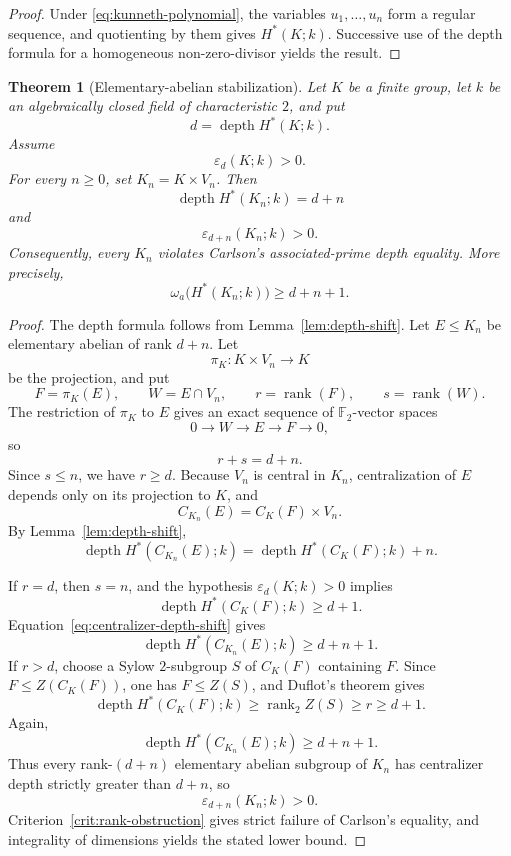 \documentclass[11pt]{amsart}
\newtheorem{theorem}{Theorem}[section]
\theoremstyle{definition}
\theoremstyle{remark}
\DeclareMathOperator{\depth}{depth}
\DeclareMathOperator{\rank}{rank}
\newcommand{\F}{\mathbb F}
\begin{document}
\begin{proof}
Under \eqref{eq:kunneth-polynomial}, the variables $u_1,\dots,u_n$ form a regular sequence, and quotienting by them gives $H^*(K;k)$.  Successive use of the depth formula for a homogeneous non-zero-divisor yields the result.
\end{proof}

\begin{theorem}[Elementary-abelian stabilization]
\label{thm:stabilization}
Let $K$ be a finite group, let $k$ be an algebraically closed field of characteristic $2$, and put
\[
d=\depth H^*(K;k).
\]
Assume
\[
\varepsilon_d(K;k)>0.
\]
For every $n\geq0$, set $K_n=K\times V_n$.  Then
\[
\depth H^*(K_n;k)=d+n
\]
and
\[
\varepsilon_{d+n}(K_n;k)>0.
\]
Consequently, every $K_n$ violates Carlson's associated-prime depth equality.  More precisely,
\[
\omega_a\bigl(H^*(K_n;k)\bigr)\geq d+n+1.
\]
\end{theorem}

\begin{proof}
The depth formula follows from Lemma~\ref{lem:depth-shift}.  Let $E\leq K_n$ be elementary abelian of rank $d+n$.  Let
\[
\pi_K:K\times V_n\longrightarrow K
\]
be the projection, and put
\[
F=\pi_K(E),
\qquad
W=E\cap V_n,
\qquad
r=\rank(F),
\qquad
s=\rank(W).
\]
The restriction of $\pi_K$ to $E$ gives an exact sequence of $\F_2$-vector spaces
\[
0\longrightarrow W\longrightarrow E\longrightarrow F\longrightarrow0,
\]
so
\[
r+s=d+n.
\]
Since $s\leq n$, we have $r\geq d$.  Because $V_n$ is central in $K_n$, centralization of $E$ depends only on its projection to $K$, and
\begin{equation}
\label{eq:centralizer-product}
C_{K_n}(E)=C_K(F)\times V_n.
\end{equation}
By Lemma~\ref{lem:depth-shift},
\begin{equation}
\label{eq:centralizer-depth-shift}
\depth H^*(C_{K_n}(E);k)
=\depth H^*(C_K(F);k)+n.
\end{equation}

If $r=d$, then $s=n$, and the hypothesis $\varepsilon_d(K;k)>0$ implies
\[
\depth H^*(C_K(F);k)\geq d+1.
\]
Equation~\eqref{eq:centralizer-depth-shift} gives
\[
\depth H^*(C_{K_n}(E);k)\geq d+n+1.
\]
If $r>d$, choose a Sylow $2$-subgroup $S$ of $C_K(F)$ containing $F$.  Since $F\leq Z(C_K(F))$, one has $F\leq Z(S)$, and Duflot's theorem gives
\[
\depth H^*(C_K(F);k)\geq\rank_2Z(S)\geq r\geq d+1.
\]
Again,
\[
\depth H^*(C_{K_n}(E);k)\geq d+n+1.
\]
Thus every rank-$(d+n)$ elementary abelian subgroup of $K_n$ has centralizer depth strictly greater than $d+n$, so
\[
\varepsilon_{d+n}(K_n;k)>0.
\]
Criterion~\ref{crit:rank-obstruction} gives strict failure of Carlson's equality, and integrality of dimensions yields the stated lower bound.
\end{proof}
\end{document}
